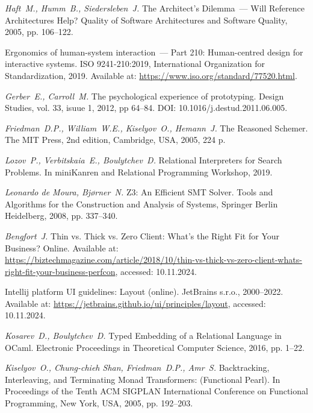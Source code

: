 {\em Haft~M., Humm~B., Siedersleben~J.} The Architect's Dilemma~--- Will Reference Architectures Help? Quality of Software Architectures and Software Quality, 2005, pp. 106--122.



Ergonomics of human-system interaction~--- Part 210: Human-centred design for interactive
systems. ISO 9241-210:2019, International Organization for Standardization, 2019. Available at: \url{https://www.iso.org/standard/77520.html}.

{\em Gerber~E., Carroll~M.} The psychological experience of prototyping. Design Studies, vol. 33, isuue 1, 2012, pp 64--84. DOI: 10.1016/j.destud.2011.06.005.

{\em Friedman~D.P., William~W.E., Kiselyov~O., Hemann~J.} The Reasoned Schemer. The MIT Press, 2nd edition, Cambridge, USA, 2005, 224 p.

{\em Lozov~P., Verbitskaia~E., Boulytchev~D.} Relational Interpreters for Search Problems. In miniKanren and Relational Programming Workshop, 2019.

{\em Leonardo de Moura, Bj{\o}rner~N.} Z3: An Efficient SMT Solver. Tools and Algorithms for the Construction and Analysis of Systems, Springer Berlin Heidelberg, 2008, pp. 337--340.

{\em Bengfort~J.} Thin vs. Thick vs. Zero Client: What’s the Right Fit for Your Business? Online. Available at:
\url{https://biztechmagazine.com/article/2018/10/thin-vs-thick-vs-zero-client-whats-right-fit-your-business-perfcon}, accessed: 10.11.2024.

Intellij platform UI guidelines: Layout (online). JetBrains s.r.o., 2000--2022. Available at: \url{https://jetbrains.github.io/ui/principles/layout}, accessed: 10.11.2024.

{\em Kosarev~D., Boulytchev~D.} Typed Embedding of a Relational Language in OCaml. Electronic Proceedings in Theoretical Computer Science, 2016, pp. 1--22.

{\em Kiselyov~O., Chung-chieh Shan, Friedman~D.P., Amr~S.} Backtracking, Interleaving, and Terminating Monad Transformers: (Functional Pearl). In Proceedings of the Tenth ACM SIGPLAN International Conference on Functional Programming, New York, USA, 2005, pp. 192--203.

